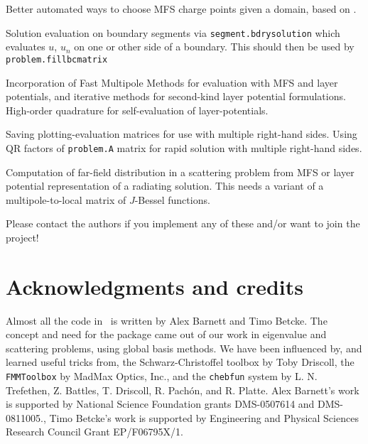 \documentclass[12pt]{article}
\begin{document}
\item Better automated ways to choose MFS charge points given a domain,
based on \cite{mfs}.

\item Solution evaluation on boundary segments via {\tt segment.bdrysolution}
 which evaluates $u$, $u_n$ on one
or other side of a boundary.
This should then be used by {\tt problem.fillbcmatrix}

\item Incorporation of Fast Multipole Methods for evaluation with MFS and
layer potentials, and iterative
methods for second-kind layer potential formulations.
High-order quadrature for self-evaluation of layer-potentials.

\item Saving plotting-evaluation matrices
for use with multiple right-hand sides.
Using QR factors of {\tt problem.A} matrix
for rapid solution with multiple right-hand sides.

\item Computation of far-field distribution in a scattering problem
from MFS or layer potential
representation of a radiating solution. This needs a variant of a
multipole-to-local matrix of $J$-Bessel functions.
\ei

Please contact the authors if you implement any of these and/or want
to join the project!



\section{Acknowledgments and credits}

Almost all the code in \mpspack\ is written by 
Alex Barnett and Timo Betcke.
The concept and need for the package came out of our work in eigenvalue
and scattering problems, using global basis methods.
We have been influenced by, and learned useful tricks from,
the Schwarz-Christoffel toolbox by Toby Driscoll,
the {\tt FMMToolbox} by MadMax Optics, Inc.,
and the {\tt chebfun} system
by L. N. Trefethen, Z. Battles, T. Driscoll, R. Pach\'{o}n, and R. Platte.
Alex Barnett's work is supported by National Science Foundation
grants DMS-0507614 and DMS-0811005., Timo Betcke's work is supported
by Engineering and Physical Sciences Research Council Grant EP/F06795X/1.
\end{document}
